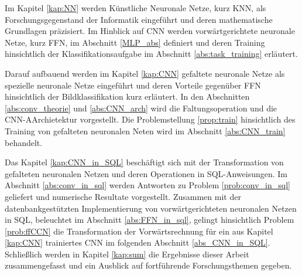 Im Kapitel \ref{kap:NN} werden Künstliche Neuronale Netze, kurz KNN, als Forschungsgegenstand der Informatik eingeführt und deren mathematische Grundlagen präzisiert. Im Hinblick auf CNN werden vorwärtgerichtete neuronale Netze, kurz FFN, im Abschnitt \ref{MLP_abs} definiert und deren Training hinsichtlich der Klassifikationsaufgabe im Abschnitt \ref{abs:task_training} erläutert. 

Darauf aufbauend werden im Kapitel \ref{kap:CNN} gefaltete neuronale Netze als spezielle neuronale Netze eingeführt und deren Vorteile gegenüber FFN hinsichtlich der Bildklassifikation kurz erläutert. In den Abschnitten \ref{abs:conv_theorie} und \ref{abs:CNN_arch} wird die Faltungsoperation und die CNN-AArchietektur vorgestellt. Die Problemstellung \ref{prop:train} hinsichtlich des Training von gefalteten neuronalen Neten wird im Abschnitt \ref{abs:CNN_train} behandelt.

Das Kapitel \ref{kap:CNN_in_SQL} beschäftigt sich mit der Transformation von gefalteten neuronalen Netzen und deren Operationen in SQL-Anweisungen. Im Abschnitt \ref{abs:conv_in_sql} werden Antworten zu Problem \ref{prob:conv_in_sql} geliefert und numerische Resultate vorgestellt. Zusammen mit der datenbankgestützten Implementierung von vorwärtgerichteten neuronalen Netzen in SQL, beleuchtet im Abschnitt \ref{abs:FFN_in_sql}, gelingt hinsichtlich Problem \ref{prob:ffCCN} die Transformation der Vorwärtsrechnung für ein aus Kapitel \ref{kap:CNN} trainiertes CNN im folgenden Abschnitt \ref{abs_CNN_in_SQL}. Schließlich werden in Kapitel \ref{kap:sum} die Ergebnisse dieser Arbeit zusammengefasst und ein Ausblick auf fortführende Forschungsthemen gegeben.

